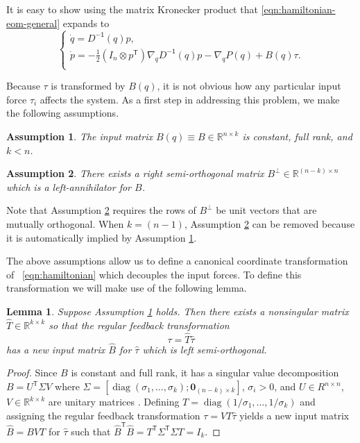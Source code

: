 \documentclass[journal,twoside,web]{ieeecolor}
\newtheorem{lemma}[thm]{Lemma} %
\newtheorem{assm}{Assumption} %
\DeclareMathOperator{\Diag}{diag}
\newcommand*{\diag}[1]{\Diag\left(#1\right)}
\newcommand*{\tpose}{^\mathsf{T}}
\newcommand*{\inv}{^\mathsf{-1}}
\newcommand*{\R}{\mathbb{R}}
\newcommand*{\Id}[1]{I_{#1}}
\newcommand*{\Zmat}[1]{\bm{0}_{#1}}
\begin{document}
It is easy to show using the matrix Kronecker product that
\eqref{eqn:hamiltonian-eom-general} expands to
\begin{equation}\label{eqn:hamiltonian-full-dynamics}
     \begin{cases}
        \dot{q} = D\inv(q)p 
        , \\
        \dot{p} = -\frac{1}{2} (\Id{n} \otimes p\tpose) \nabla_q D\inv(q) p
        - \nabla_q P(q) + B(q) \tau
        . \\
    \end{cases}
\end{equation}

Because \(\tau\) is transformed by \(B(q)\), it is not obvious how any
particular input force \(\tau_i\) affects the system.
As a first step in addressing this problem, we make the following assumptions.

\begin{assm}\label{assm:B-const}
    The input matrix \(B(q) \equiv B \in \R^{n\times k}\) is constant,
    full rank, and \(k < n\).
\end{assm}

\begin{assm}\label{assm:B-perp}
    There exists a right semi-orthogonal matrix 
    \(B^\perp \in \R^{(n-k)\times n}\)
    which is a left-annihilator for \(B\). 
\end{assm}

Note that Assumption \ref{assm:B-perp} requires the rows of \(B^\perp\) be unit vectors
that are mutually orthogonal. 
When \(k = (n-1)\), Assumption \ref{assm:B-perp} can be removed because it is
automatically implied by Assumption \ref{assm:B-const}.

The above assumptions allow us to define a
canonical coordinate transformation of ~\eqref{eqn:hamiltonian} 
which decouples the input forces.
To define this transformation we will make use of the following lemma.

\begin{lemma}\label{lemma:B-orthogonal}
    Suppose Assumption \ref{assm:B-const} holds. Then
    there exists a nonsingular matrix \(\hat{T} \in \R^{k \times k}\) 
    so that the regular feedback transformation 
    \[
        \tau = \hat{T} \hat{\tau}
    \] 
    has a new input matrix \(\hat{B}\) for \(\hat{\tau}\) which is left
    semi-orthogonal.  
\end{lemma}
\begin{proof}
    Since \(B\) is constant and full rank, it has a singular value decomposition 
    \(B = U\tpose \Sigma V\) where 
    \(\Sigma = [\diag{\sigma_1,\ldots,\sigma_k}; \Zmat{(n-k)\times k}]\),
    \(\sigma_i > 0\), and \(U \in R^{n \times n}\),
    \(V \in \R^{k \times k}\) are unitary matrices \cite{calculating_svd}.
    Defining \(T = \diag{1/\sigma_1,\ldots,1/\sigma_k}\) and assigning the
    regular feedback transformation \(\tau = V T \hat{\tau}\) yields a new input
    matrix \(\hat{B} = B V T\) for \(\hat{\tau}\) such that
    \(\hat{B}\tpose \hat{B} = T\tpose \Sigma\tpose \Sigma T = \Id{k}\).
\end{proof}
\end{document}
